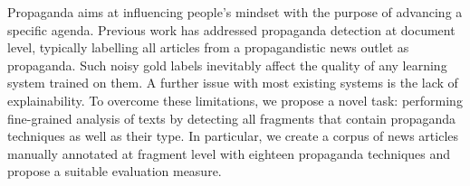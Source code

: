Propaganda aims at influencing people's mindset with the purpose of advancing a specific agenda. Previous work has addressed propaganda detection at document level, typically labelling all articles from a propagandistic news outlet as propaganda. Such noisy gold labels inevitably affect the quality of any learning system trained on them. A further issue with most existing systems is the lack of explainability. 
To overcome these limitations, we propose a novel task: performing fine-grained analysis of texts by detecting all fragments that contain propaganda techniques as well as their type. In particular, we create a corpus of news articles manually annotated at fragment level with eighteen propaganda techniques and propose a suitable evaluation measure.